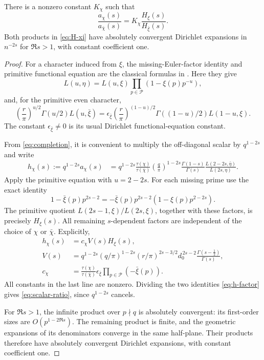 \begin{lemma}\label{lem:scalar-ratio}
There is a nonzero constant \(K_\chi\) such that
\begin{equation}\label{eq:scalar-ratio}
 \frac{a_\chi(s)}{a_{\bar\chi}(s)}
 =K_\chi\frac{H_\xi(s)}{H_{\bar\xi}(s)}.
\end{equation}
Both products in \eqref{eq:H-xi} have absolutely convergent
Dirichlet expansions in \(n^{-2s}\) for \(\Re s>1\), with
constant coefficient one.
\end{lemma}
\begin{proof}
For a character induced from \(\xi\), the missing-Euler-factor identity
and primitive functional equation are the classical formulas in
\citet[equations 25.15.4--25.15.6]{DLMF2026}. Here they give
\[
 L(u,\eta)=L(u,\xi)\prod_{p\in\mathcal P}(1-\xi(p)p^{-u}),
\]
and, for the primitive even character,
\[
 \left(\frac r\pi\right)^{u/2}\Gamma(u/2)L(u,\bar\xi)
 =\epsilon_{\bar\xi}
   \left(\frac r\pi\right)^{(1-u)/2}
   \Gamma((1-u)/2)L(1-u,\xi).
\]
The constant \(\epsilon_{\bar\xi}\ne0\) is its usual
Dirichlet functional-equation constant.

From \eqref{eq:completion}, it is convenient to multiply the
off-diagonal scalar by \(q^{1-2s}\) and write
\begin{align}
 h_\chi(s):=q^{1-2s}a_\chi(s)
 &=q^{1-2s}\frac{\tau(\chi)}{\tau(\bar\chi)}
   \left(\frac q\pi\right)^{1-2s}
   \frac{\Gamma(1-s)}{\Gamma(s)}
   \frac{L(2-2s,\bar\eta)}{L(2s,\eta)}.
 \label{eq:h-chi}
\end{align}
Apply the primitive equation with \(u=2-2s\).
For each missing prime use the exact identity
\[
 1-\bar\xi(p)p^{2s-2}
 =-\bar\xi(p)p^{2s-2}(1-\xi(p)p^{2-2s}).
\]
The primitive quotient \(L(2s-1,\xi)/L(2s,\xi)\), together with
these factors, is precisely \(H_\xi(s)\). All remaining
\(s\)-dependent factors are independent of the choice of \(\chi\)
or \(\bar\chi\). Explicitly,
\begin{align}
 h_\chi(s)&=c_\chi V(s)H_\xi(s),\label{eq:h-factor}\\
 V(s)&=
 q^{1-2s}(q/\pi)^{1-2s}(r/\pi)^{2s-3/2}
 d_0^{\,2s-2}\frac{\Gamma(s-\tfrac12)}{\Gamma(s)},\nonumber\\
 c_\chi&=
 \frac{\tau(\chi)}{\tau(\bar\chi)}
 \epsilon_{\bar\xi}\prod_{p\in\mathcal P}(-\bar\xi(p)).
 \nonumber
\end{align}
All constants in the last line are nonzero. Dividing the two
identities \eqref{eq:h-factor} gives \eqref{eq:scalar-ratio},
since \(q^{1-2s}\) cancels.

For \(\Re s>1\), the infinite product over \(p\nmid q\)
is absolutely convergent: its first-order sizes are
\(O(p^{1-2\Re s})\). The remaining product is finite, and the
geometric expansions of its denominators converge in the same
half-plane. Their products therefore have absolutely convergent
Dirichlet expansions, with constant coefficient one.
\end{proof}

